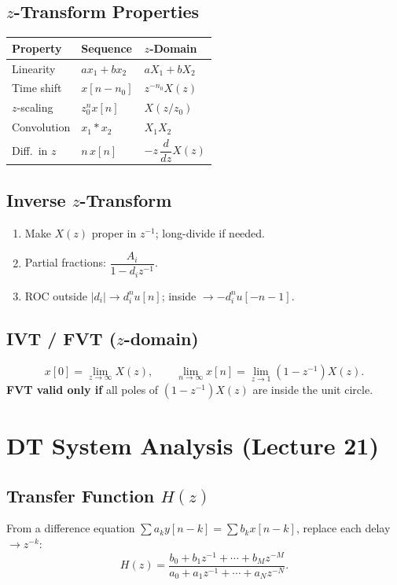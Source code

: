 \documentclass[11pt]{article}
\begin{document}
\subsection{$z$-Transform Properties}
\begin{center}
\begin{tabular}{lll}
\toprule
Property & Sequence & $z$-Domain \\
\midrule
Linearity & $ax_1 + bx_2$ & $aX_1 + bX_2$ \\
Time shift & $x[n - n_0]$ & $z^{-n_0}X(z)$ \\
$z$-scaling & $z_0^n x[n]$ & $X(z/z_0)$ \\
Convolution & $x_1 * x_2$ & $X_1 X_2$ \\
Diff.\ in $z$ & $n\,x[n]$ & $-z\,\dfrac{d}{dz}X(z)$ \\
\bottomrule
\end{tabular}
\end{center}

\subsection{Inverse $z$-Transform}
\begin{enumerate}
  \item Make $X(z)$ proper in $z^{-1}$; long-divide if needed.
  \item Partial fractions: $\dfrac{A_i}{1 - d_i z^{-1}}$.
  \item ROC outside $|d_i| \to d_i^n u[n]$; inside $\to -d_i^n u[-n-1]$.
\end{enumerate}

\subsection{IVT / FVT ($z$-domain)}
\[ x[0] = \lim_{z \to \infty} X(z), \qquad \lim_{n \to \infty} x[n] = \lim_{z \to 1}(1 - z^{-1}) X(z). \]
\textbf{FVT valid only if} all poles of $(1 - z^{-1})X(z)$ are inside the unit circle.

\section{DT System Analysis (Lecture 21)}

\subsection{Transfer Function $H(z)$}
From a difference equation $\sum a_k y[n-k] = \sum b_k x[n-k]$, replace each delay $\to z^{-k}$:
\[ H(z) = \frac{b_0 + b_1 z^{-1} + \cdots + b_M z^{-M}}{a_0 + a_1 z^{-1} + \cdots + a_N z^{-N}}. \]
\end{document}

